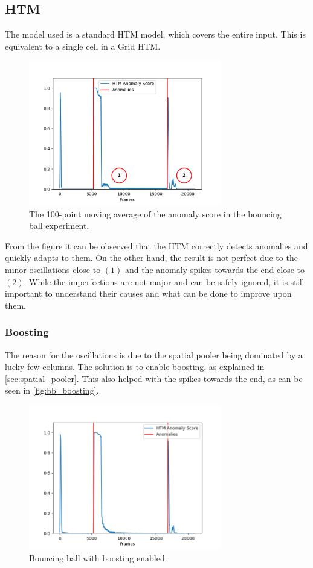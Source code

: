 \subsection{HTM}
The model used is a standard HTM model, which covers the entire input. This is equivalent to a single cell in a Grid HTM.
\begin{figure}[H]
    \centering
    \includegraphics[width=0.75\textwidth]{resources/experiments/bouncing_ball/bb_anoms_bad.png}
    \caption{The 100-point moving average of the anomaly score in the bouncing ball experiment.}
\end{figure}
From the figure it can be observed that the HTM correctly detects anomalies and quickly adapts to them. On the other hand, the result is not perfect due to the minor oscillations close to $(1)$ and the anomaly spikes towards the end close to $(2)$. While the imperfections are not major and can be safely ignored, it is still important to understand their causes and what can be done to improve upon them. \par
\subsubsection{Boosting}
The reason for the oscillations is due to the spatial pooler being dominated by a lucky few columns. The solution is to enable boosting, as explained in \autoref{sec:spatial_pooler}. This also helped with the spikes towards the end, as can be seen in \autoref{fig:bb_boosting}.\par
\begin{figure}[H]
    \centering
    \includegraphics[width=0.75\textwidth]{resources/experiments/bouncing_ball/bb_anoms_boosting.png}
    \caption{Bouncing ball with boosting enabled.}
    \label{fig:bb_boosting}
\end{figure}
